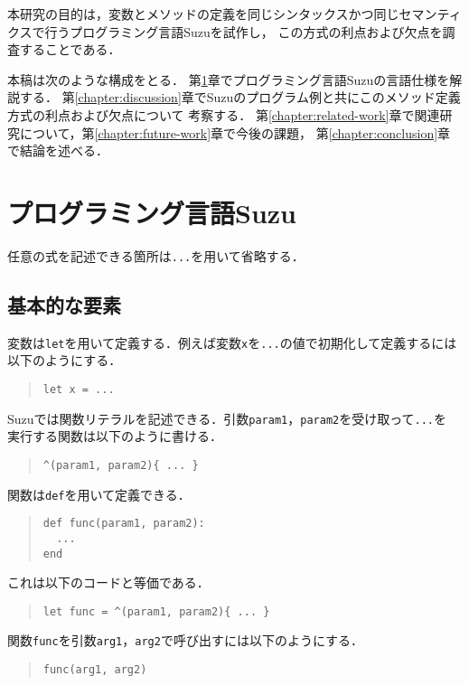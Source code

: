 \documentclass[a4paper,11pt,dvipdfmx]{jreport}
\begin{document}
本研究の目的は，変数とメソッドの定義を同じシンタックスかつ同じセマンティクスで行うプログラミング言語Suzuを試作し，
この方式の利点および欠点を調査することである．

本稿は次のような構成をとる．
第\ref{chapter:implementation}章でプログラミング言語Suzuの言語仕様を解説する．
第\ref{chapter:discussion}章でSuzuのプログラム例と共にこのメソッド定義方式の利点および欠点について
考察する．
第\ref{chapter:related-work}章で関連研究について，第\ref{chapter:future-work}章で今後の課題，
第\ref{chapter:conclusion}章で結論を述べる．


\chapter{プログラミング言語Suzu}
\label{chapter:implementation}

任意の式を記述できる箇所は\verb|...|を用いて省略する．

\section{基本的な要素}

変数は\verb|let|を用いて定義する．例えば変数\verb|x|を\verb|...|の値で初期化して定義するには
以下のようにする．
\begin{quote}
\begin{verbatim}
let x = ...
\end{verbatim}
\end{quote}

Suzuでは関数リテラルを記述できる．引数\verb|param1|，\verb|param2|を受け取って\verb|...|を
実行する関数は以下のように書ける．
\begin{quote}
\begin{verbatim}
^(param1, param2){ ... }
\end{verbatim}
\end{quote}

関数は\verb|def|を用いて定義できる．
\begin{quote}
\begin{verbatim}
def func(param1, param2):
  ...
end
\end{verbatim}
\end{quote}
これは以下のコードと等価である．
\begin{quote}
\begin{verbatim}
let func = ^(param1, param2){ ... }
\end{verbatim}
\end{quote}

関数\verb|func|を引数\verb|arg1|，\verb|arg2|で呼び出すには以下のようにする．
\begin{quote}
\begin{verbatim}
func(arg1, arg2)
\end{verbatim}
\end{quote}
\end{document}
